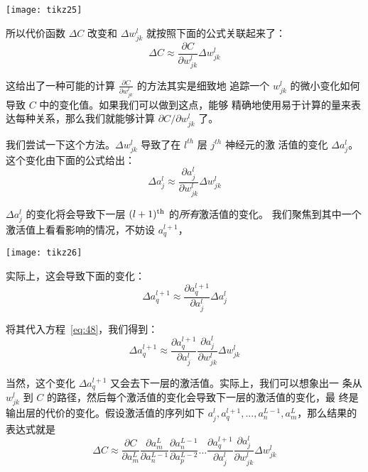 \begin{center}
  \texttt{[image: tikz25]}
\end{center}

所以代价函数 $\Delta C$ 改变和 $\Delta w_{jk}^l$ 就按照下面的公式关联起来了：
\begin{equation}
  \Delta C \approx \frac{\partial C}{\partial w^l_{jk}} \Delta w^l_{jk}
  \label{eq:47}\tag{47}
\end{equation}

这给出了一种可能的计算 $\frac{\partial C}{\partial w_{jk}^l}$ 的方法其实是细致地
追踪一个 $w_{jk}^l$ 的微小变化如何导致 $C$ 中的变化值。如果我们可以做到这点，能够
精确地使用易于计算的量来表达每种关系，那么我们就能够计算 $\partial C / \partial
w^l_{jk}$ 了。

我们尝试一下这个方法。$\Delta w_{jk}^l$ 导致了在 $l^{th}$ 层 $j^{th}$ 神经元的激
活值的变化 $\Delta a_j^l$。这个变化由下面的公式给出：
\begin{equation}
  \Delta a^l_j \approx \frac{\partial a^l_j}{\partial w^l_{jk}} \Delta w^l_{jk}
  \label{eq:48}\tag{48}
\end{equation}

$\Delta a_j^l$ 的变化将会导致下一层 $(l+1)^{\rm th}$ 的\emph{所有}激活值的变化。
我们聚焦到其中一个激活值上看看影响的情况，不妨设 $a_q^{l+1}$，

\begin{center}
  \texttt{[image: tikz26]}
\end{center}

实际上，这会导致下面的变化：
\begin{equation}
  \Delta a^{l+1}_q \approx \frac{\partial a^{l+1}_q}{\partial a^l_j} \Delta
  a^l_j
  \label{eq:49}\tag{49}
\end{equation}

将其代入方程~\eqref{eq:48}，我们得到：
\begin{equation}
  \Delta a^{l+1}_q \approx \frac{\partial a^{l+1}_q}{\partial a^l_j}
  \frac{\partial a^l_j}{\partial w^l_{jk}} \Delta w^l_{jk}
  \label{eq:50}\tag{50}
\end{equation}

当然，这个变化 $\Delta a^{l+1}_q$ 又会去下一层的激活值。实际上，我们可以想象出一
条从 $w_{jk}^l$ 到 $C$ 的路径，然后每个激活值的变化会导致下一层的激活值的变化，最
终是输出层的代价的变化。假设激活值的序列如下 $a_j^l, a_q^{l+1},
...,a_n^{L-1},a_m^{L}$，那么结果的表达式就是
\begin{equation}
  \Delta C \approx \frac{\partial C}{\partial a^L_m}
  \frac{\partial a^L_m}{\partial a^{L-1}_n}
  \frac{\partial a^{L-1}_n}{\partial a^{L-2}_p} \ldots
  \frac{\partial a^{l+1}_q}{\partial a^l_j}
  \frac{\partial a^l_j}{\partial w^l_{jk}} \Delta w^l_{jk}
  \label{eq:51}\tag{51}
\end{equation}

